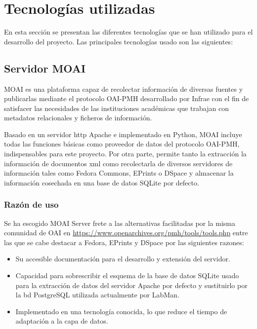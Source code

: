 \chapter{Tecnologías utilizadas}

En esta sección se presentan las diferentes tecnologías que se han utilizado para el desarrollo del proyecto. Las principales tecnologías usado son las siguientes:

\section{Servidor MOAI}

MOAI\cite{MOAI} es una plataforma capaz de recolectar información de diversas fuentes y publicarlas mediante el protocolo OAI-PMH desarrollado por Infrae\cite{Infrae} con el fin de satisfacer las necesidades de las instituciones académicas que trabajan con metadatos relacionales y ficheros de información.

Basado en un servidor \acrshort{http} Apache\cite{HTTPApache} e implementado en Python\cite{Python}, MOAI incluye todas las funciones básicas como proveedor de datos del protocolo OAI-PMH, indispensables para este proyecto. Por otra parte, permite tanto la extracción la información de documentos \acrshort{xml}\cite{XML} como recolectarla de diversos servidores de información tales como Fedora Commons\cite{Fedora}, EPrints\cite{EPrints} o DSpace\cite{DSpace} y almacenar la información cosechada en una base de datos SQLite\cite{SQLite} por defecto.

\subsection{Razón de uso}

Se ha escogido MOAI Server frete a las alternativas facilitadas por la misma comunidad de OAI en \url{https://www.openarchives.org/pmh/tools/tools.php} entre las que se cabe destacar a Fedora, EPrints y DSpace por las siguientes razones:

\begin{itemize}
	\item Su accesible documentación para el desarrollo y extensión del servidor.
	\item Capacidad para sobrescribir el esquema de la base de datos SQLite usado para la extracción de datos del servidor Apache por defecto y sustituirlo por la \acrshort{bd} PostgreSQL\cite{PostgreSQL} utilizada actualmente por LabMan.
	\item Implementado en una tecnología conocida, lo que reduce el tiempo de adaptación a la capa de datos.
\end{itemize}

